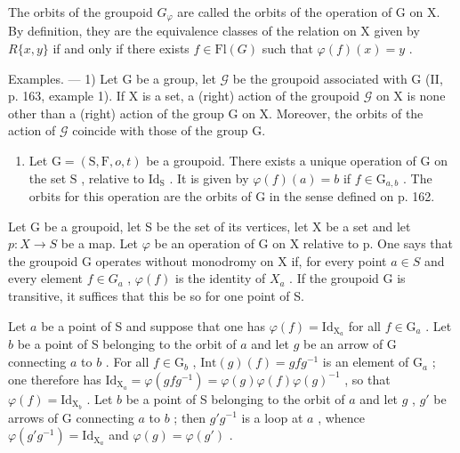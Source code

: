 The orbits of the groupoid \(G_{\varphi}\) are called the orbits of the operation of G on X. By definition, they are the equivalence classes of the relation on X given by \(R\{x,y\}\) if and only if there exists \(f \in \mathrm{Fl}(G)\) such that \(\varphi(f)(x) = y\) .

Examples. --- 1) Let G be a group, let \(\mathcal{G}\) be the groupoid associated with G (II, p. 163, example 1). If X is a set, a (right) action of the groupoid \(\mathcal{G}\) on X is none other than a (right) action of the group G on X. Moreover, the orbits of the action of \(\mathcal{G}\) coincide with those of the group G.

\begin{enumerate}
\def\labelenumi{\arabic{enumi})}
\setcounter{enumi}{1}
\tightlist
\item
  Let \(\mathrm{G} = (\mathrm{S},\mathrm{F},o,t)\) be a groupoid. There exists a unique operation of \(\mathrm{G}\) on the set \(\mathrm{S}\) , relative to \(\mathrm{Id}_{\mathrm{S}}\) . It is given by \(\varphi(f)(a) = b\) if \(f \in \mathrm{G}_{a,b}\) . The orbits for this operation are the orbits of \(\mathrm{G}\) in the sense defined on p. 162.
\end{enumerate}

Let G be a groupoid, let S be the set of its vertices, let X be a set and let \(p: X \to S\) be a map. Let \(\varphi\) be an operation of G on X relative to p. One says that the groupoid G operates without monodromy on X if, for every point \(a \in S\) and every element \(f \in G_{a}\) , \(\varphi(f)\) is the identity of \(X_{a}\) . If the groupoid G is transitive, it suffices that this be so for one point of S.

Let \(a\) be a point of S and suppose that one has \(\varphi(f) = \mathrm{Id}_{\mathrm{X}_a}\) for all \(f \in \mathrm{G}_a\) . Let \(b\) be a point of S belonging to the orbit of \(a\) and let \(g\) be an arrow of G connecting \(a\) to \(b\) . For all \(f \in \mathrm{G}_b\) , \(\mathrm{Int}(g)(f) = gfg^{-1}\) is an element of \(\mathrm{G}_a\) ; one therefore has \(\mathrm{Id}_{\mathrm{X}_a} = \varphi(gfg^{-1}) = \varphi(g)\varphi(f)\varphi(g)^{-1}\) , so that \(\varphi(f) = \mathrm{Id}_{\mathrm{X}_b}\) . Let \(b\) be a point of S belonging to the orbit of \(a\) and let \(g\) , \(g'\) be arrows of G connecting \(a\) to \(b\) ; then \(g'g^{-1}\) is a loop at \(a\) , whence \(\varphi(g'g^{-1}) = \mathrm{Id}_{\mathrm{X}_a}\) and \(\varphi(g) = \varphi(g')\) .

